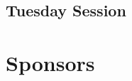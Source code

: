 \documentclass[openany, parskip=full, 12pt, a4]{scrbook}
\begin{document}
\section{Tuesday Session}




 
% 
 

% 

\chapter{Sponsors}



\newpage


\pagecolor{myblue}
\thispagestyle{empty}
\mbox{}
\end{document}
